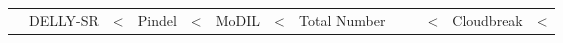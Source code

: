 \begin{table}[t]
\begin{center}
\begin{tabular}{r|rrr|rrrrr}
&  DELLY-SR           & <%
&  Pindel           & <%
&  MoDIL           & <%
   \hline
{} & Total Number &          &           & <%
&  Cloudbreak   &<%

\end{tabular}
\end{center}
\end{table}
